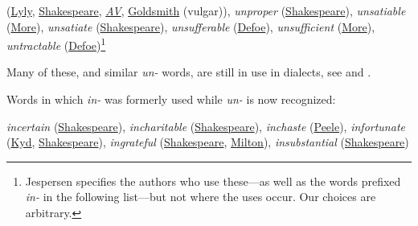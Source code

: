 (\href{https://archive.org/details/bim_early-english-books-1475-1640_campaspe-played-beefore-_lyly-john_1591/page/III/mode/2up?q=vnpossible&view=theater}{Lyly}, \href{https://internetshakespeare.uvic.ca/doc/R2_Q1/scene/2.2/index.html#tln-1075}{Shakespeare}, \href{https://archive.org/details/authorizedversio05wrig/page/124/mode/2up?q=vnpossible&view=theater}{\textit{AV}}, \href{https://archive.org/details/shestoopstoconqu03gold/page/30/mode/2up?q=%22parfectly%22&view=theater}{Goldsmith} (vulgar)), \textit{unproper} (\href{https://internetshakespeare.uvic.ca/doc/Oth_F1/scene/4.1/index.html#tln-2445}{Shakespeare}), \textit{unsatiable} (\href{https://archive.org/details/utopiasirthomas00robigoog/page/n161/mode/2up?q=vnsatiable&view=theater}{More}), \textit{unsatiate} (\href{https://internetshakespeare.uvic.ca/doc/R3_Q1/scene/3.5/index.html#tln-2170}{Shakespeare}), \textit{unsufferable} (\href{https://archive.org/details/journalofplaguey1881defo/page/296/mode/2up?view=theater&q=%22unsufferable%22}{Defoe}), \textit{unsufficient} (\href{https://archive.org/details/utopiasirthomas00robigoog/page/n205/mode/2up?q=vnsufficient&view=theater}{More}), \textit{untractable} (\href{https://ia800900.us.archive.org/29/items/compleatenglishg00deforich/compleatenglishg00deforich.pdf}{Defoe})\footnote{Jespersen specifies the authors who use these---as well as the words prefixed \textit{in-} in the following list---but not where the uses occur. Our choices are arbitrary. \eds}\\ %

\setlength{\leftskip}{0em}


Many of these, and similar \textit{un-} words, are still in use in dialects, see \citet{wright1905english6} and \citet[\href{https://www.gutenberg.org/cache/epub/47364/pg47364-images.html\#Page_31}{31}]{wright1913rustic}.

Words in which \textit{in-} was formerly used while \textit{un-} is now recognized:

\bigskip
\setlength{\leftskip}{1.55em}\noindent \textit{incertain} (\href{https://internetshakespeare.uvic.ca/doc/WT_F1/scene/5.1/index.html#tln-2760}{Shakespeare}), 
 \textit{incharitable} (\href{https://internetshakespeare.uvic.ca/doc/Tmp_F1/scene/index.html#tln-50}{Shakespeare}), 
 \textit{inchaste} (\href{https://archive.org/details/worksofgeorgepee02peel/page/52/mode/2up?q=inchaste&view=theater}{Peele}), 
 \textit{infortunate} (\href{https://archive.org/details/cu31924013131614/page/36/mode/2up?q=infortunate&view=theater}{Kyd}, \href{https://internetshakespeare.uvic.ca/doc/Jn_F1/scene/2.1/index.html#tln-480}{Shakespeare}), 
 \textit{ingrateful} (\href{https://internetshakespeare.uvic.ca/doc/Jn_F1/scene/5.7/index.html#tln-2650}{Shakespeare}, \href{https://archive.org/details/poeticalworksofj00miltiala/page/524/mode/2up?ref=ol&view=theater&q=%22ingrateful%22}{Milton}), 
 \textit{insubstantial} (\href{https://internetshakespeare.uvic.ca/doc/Tmp_F1/scene/4.1/index.html#tln-1825}{Shakespeare})

